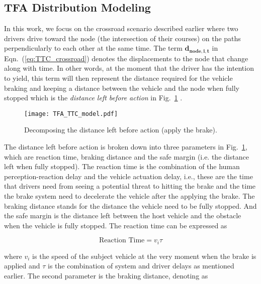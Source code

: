 \subsection{TFA Distribution Modeling}

In this work, we focus on the crossroad scenario described earlier where two drivers drive toward the node (the intersection of their courses) on the paths perpendicularly to each other at the same time. The term $\mathbf{d_{node,i, t}}$ in Eqn.~(\ref{eq:TTC_crossroad}) denotes the displacements to the node that change along with time. In other words, at the moment that the driver has the intention to yield, this term will then represent the distance required for the vehicle braking and keeping a distance between the vehicle and the node when fully stopped which is the \textit{distance left before action} in Fig.~\ref{fig:TFA_model} .

\begin{figure}[htbp!]
\begin{center}
\texttt{[image: TFA\_TTC\_model.pdf]}
\end{center}
\caption{Decomposing the distance left before action (apply the brake).}
\label{fig:TFA_model} 
\end{figure}


The distance left before action is broken down into three parameters in Fig.~\ref{fig:TFA_model}, which are reaction time, braking distance and the safe margin (i.e. the distance left when fully stopped). The reaction time is the combination of the human perception-reaction delay and the vehicle actuation delay, i.e., these are the time that drivers need from seeing a potential threat to hitting the brake and the time the brake system need to decelerate the vehicle after the applying the brake. The braking distance stands for the distance the vehicle need to be fully stopped. And the safe margin is the distance left between the host vehicle and the obstacle when the vehicle is fully stopped. The reaction time can be expressed as 

\begin{equation}
\text{Reaction Time} = {v_i}\tau
\label{eq:V_tau}
\end{equation}

\noindent where ${v_i}$ is the speed of the subject vehicle at the very moment when the brake is applied and $\tau$ is the combination of system and driver delays as mentioned earlier. The second parameter is the braking distance, denoting as


